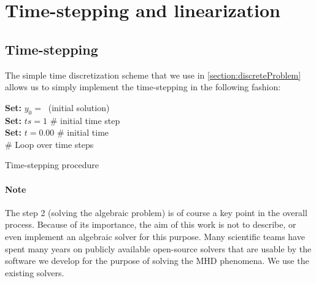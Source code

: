 \section{Time-stepping and linearization}

\subsection{Time-stepping}
The simple time discretization scheme that we use in \cref{section:discreteProblem} allows us to simply implement the time-stepping in the following fashion:\\
\begin{algorithm}[H]
\textbf{    Set: }$y_0 =\ $ (initial solution)\\
\textbf{    Set: }$ts = 1 $ \# initial time step\\
\textbf{    Set: }$t = 0.00 $ \# initial time\\
    \# Loop over time steps\\
    \caption{Time-stepping procedure}
\label{algorithm:timeStepping}
\end{algorithm}
\paragraph{Note}
\label{note:solvers}
The step 2 (solving the algebraic problem) is of course a key point in the overall process. Because of its importance, the aim of this work is not to describe, or even implement an algebraic solver for this purpose. Many scientific teams have spent many years on publicly available open-source solvers that are usable by the software we develop for the purpose of solving the MHD phenomena. We use the existing solvers.
